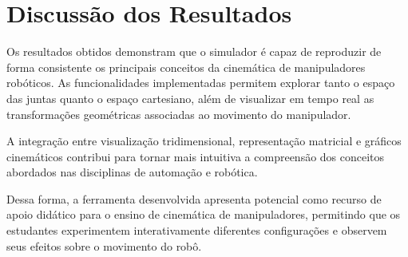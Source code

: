 \section{Discussão dos Resultados}

Os resultados obtidos demonstram que o simulador é capaz de reproduzir de forma consistente os principais conceitos da cinemática de manipuladores robóticos. As funcionalidades implementadas permitem explorar tanto o espaço das juntas quanto o espaço cartesiano, além de visualizar em tempo real as transformações geométricas associadas ao movimento do manipulador.

A integração entre visualização tridimensional, representação matricial e gráficos cinemáticos contribui para tornar mais intuitiva a compreensão dos conceitos abordados nas disciplinas de automação e robótica.

Dessa forma, a ferramenta desenvolvida apresenta potencial como recurso de apoio didático para o ensino de cinemática de manipuladores, permitindo que os estudantes experimentem interativamente diferentes configurações e observem seus efeitos sobre o movimento do robô.
